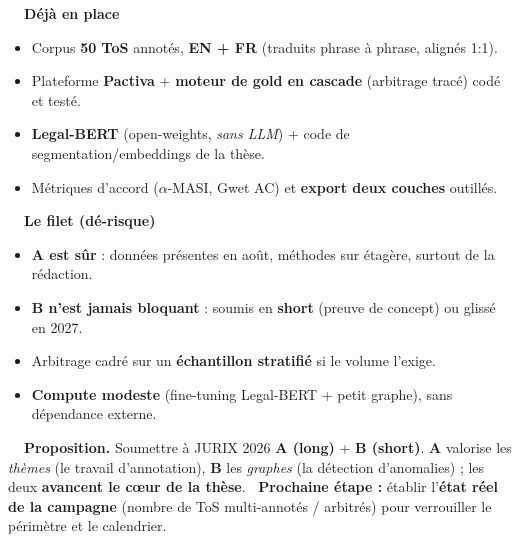 \documentclass[fontsize=9pt,a4paper]{scrartcl}
\begin{document}
{\small
\begin{minipage}[t]{0.485\linewidth}
{\sffamily\footnotesize\color{navy}\textbf{\faServer~~Déjà en place}}
\begin{itemize}
  \item Corpus \textbf{50 ToS} annotés, \textbf{EN + FR} (traduits phrase à phrase, alignés 1:1).
  \item Plateforme \textbf{Pactiva} + \textbf{moteur de gold en cascade} (arbitrage tracé) codé et testé.
  \item \textbf{Legal-BERT} (open-weights, \emph{sans LLM}) + code de segmentation/embeddings de la thèse.
  \item Métriques d'accord ($\alpha$-MASI, Gwet AC) et \textbf{export deux couches} outillés.
\end{itemize}
\end{minipage}\hfill
\begin{minipage}[t]{0.485\linewidth}
{\sffamily\footnotesize\color{navy}\textbf{\faLifeRing~~Le filet (dé-risque)}}
\begin{itemize}
  \item \textbf{A est sûr} : données présentes en août, méthodes sur étagère, surtout de la rédaction.
  \item \textbf{B n'est jamais bloquant} : soumis en \textbf{short} (preuve de concept) ou glissé en 2027.
  \item Arbitrage cadré sur un \textbf{échantillon stratifié} si le volume l'exige.
  \item \textbf{Compute modeste} (fine-tuning Legal-BERT + petit graphe), sans dépendance externe.
\end{itemize}
\end{minipage}}

\vspace{5pt}
\begin{tcolorbox}[enhanced,colback=navy,colframe=navy,boxrule=0pt,arc=2pt,
  left=10pt,right=10pt,top=6pt,bottom=6pt,borderline west={3pt}{0pt}{gold}]
  {\color{white}\small\textbf{\faFlag~~Proposition.} Soumettre à JURIX 2026 \textbf{A (long)} +
  \textbf{B (short)}. \textbf{A} valorise les \emph{thèmes} (le travail d'annotation), \textbf{B} les
  \emph{graphes} (la détection d'anomalies) ; les deux \textbf{avancent le cœur de la thèse}. \;
  \textbf{\faBullseye~Prochaine étape :} établir l'\textbf{état réel de la campagne} (nombre de ToS
  multi-annotés / arbitrés) pour verrouiller le périmètre et le calendrier.}
\end{tcolorbox}
\end{document}
